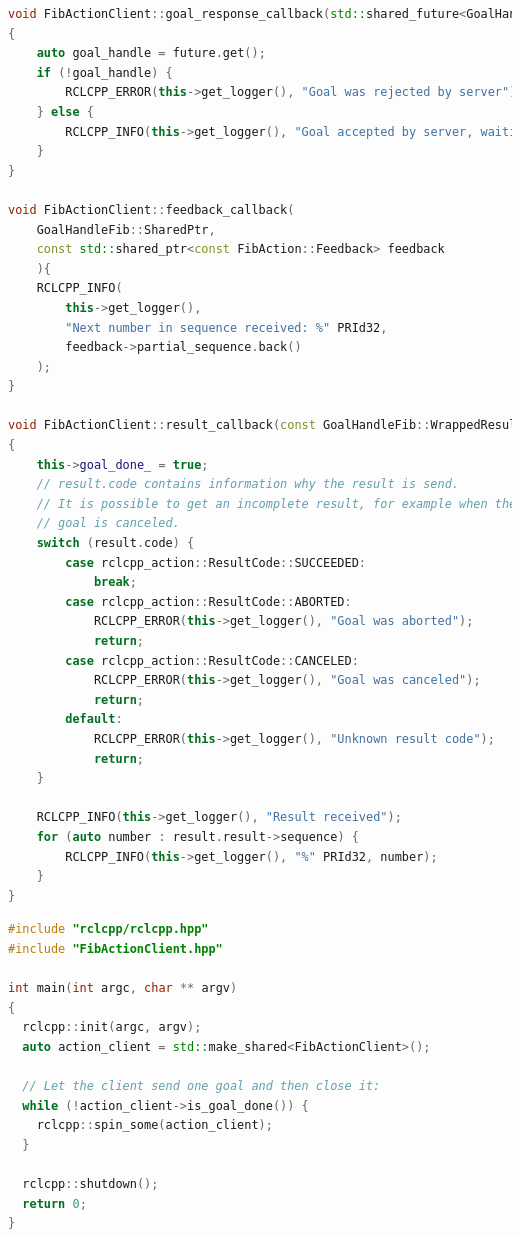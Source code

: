 \begin{lstlisting}[language=C++, caption={ActionClientNode.cpp}, firstnumber=0, label={code:action_client_cpp}]
void FibActionClient::goal_response_callback(std::shared_future<GoalHandleFib::SharedPtr> future)
{
    auto goal_handle = future.get();
    if (!goal_handle) {
        RCLCPP_ERROR(this->get_logger(), "Goal was rejected by server");
    } else {
        RCLCPP_INFO(this->get_logger(), "Goal accepted by server, waiting for result");
    }
}

void FibActionClient::feedback_callback(
    GoalHandleFib::SharedPtr,
    const std::shared_ptr<const FibAction::Feedback> feedback
    ){
    RCLCPP_INFO(
        this->get_logger(), 
        "Next number in sequence received: %" PRId32,
        feedback->partial_sequence.back()
    );
}

void FibActionClient::result_callback(const GoalHandleFib::WrappedResult & result)
{
    this->goal_done_ = true;
    // result.code contains information why the result is send.
    // It is possible to get an incomplete result, for example when the
    // goal is canceled.
    switch (result.code) {
        case rclcpp_action::ResultCode::SUCCEEDED:
            break;
        case rclcpp_action::ResultCode::ABORTED:
            RCLCPP_ERROR(this->get_logger(), "Goal was aborted");
            return;
        case rclcpp_action::ResultCode::CANCELED:
            RCLCPP_ERROR(this->get_logger(), "Goal was canceled");
            return;
        default:
            RCLCPP_ERROR(this->get_logger(), "Unknown result code");
            return;
    }   

    RCLCPP_INFO(this->get_logger(), "Result received");
    for (auto number : result.result->sequence) {
        RCLCPP_INFO(this->get_logger(), "%" PRId32, number);
    }
}
\end{lstlisting}

\begin{lstlisting}[language=C++, caption={mainActionClientNode.cpp}, firstnumber=0, label={code:action_client_main}]
#include "rclcpp/rclcpp.hpp"
#include "FibActionClient.hpp"

int main(int argc, char ** argv)
{
  rclcpp::init(argc, argv);
  auto action_client = std::make_shared<FibActionClient>();

  // Let the client send one goal and then close it:
  while (!action_client->is_goal_done()) {
    rclcpp::spin_some(action_client);
  }

  rclcpp::shutdown();
  return 0;
}
\end{lstlisting}




